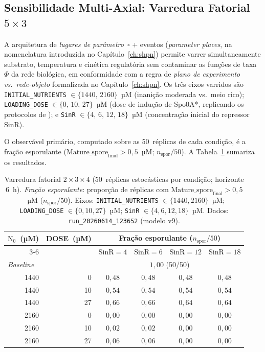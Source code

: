 \subsection{Sensibilidade Multi-Axial: Varredura Fatorial $5 \times 3$}
\label{sec:v6-factorial}

A arquitetura de \emph{lugares de parâmetro}~$\square$ + eventos
(\textit{parameter places}, na nomenclatura introduzida no
Capítulo~\ref{ch:shpn}) permite varrer simultaneamente substrato,
temperatura e cinética regulatória sem contaminar as funções de
taxa~$\Phi$ da rede biológica, em conformidade com a regra de
\emph{plano de experimento vs.\ rede-objeto} formalizada no
Capítulo~\ref{ch:shpn}.  Os três eixos varridos são
\texttt{INITIAL\_NUTRIENTS} $\in \{1440,\,2160\}$~µM (inanição moderada
vs.\ meio rico); \texttt{LOADING\_DOSE} $\in \{0,\,10,\,27\}$~µM (dose
de indução de Spo0A*, replicando os protocolos de \textcite{Fujita2005}); e
\texttt{SinR} $\in \{4,\,6,\,12,\,18\}$~µM (concentração inicial do
repressor SinR).

O observável primário, computado sobre as 50~réplicas de cada condição,
é a fração esporulante
($\text{Mature\_spore}_{\text{final}} > 0{,}5$~µM; $n_{\text{spor}}/50$).
A Tabela~\ref{tab:v6-factorial} sumariza os resultados.

\begin{table}[htbp]
\centering
\caption{Varredura fatorial $2 \times 3 \times 4$
(50~réplicas estocásticas por condição; horizonte 6~h).
\emph{Fração esporulante}: proporção de réplicas com
$\text{Mature\_spore}_{\text{final}} > 0{,}5$~µM ($n_{\text{spor}}/50$).
Eixos: \texttt{INITIAL\_NUTRIENTS} $\in \{1440, 2160\}$~µM;
\texttt{LOADING\_DOSE} $\in \{0, 10, 27\}$~µM;
\texttt{SinR} $\in \{4, 6, 12, 18\}$~µM.
Dados: \texttt{run\_20260614\_123652} (modelo v9).}
\label{tab:v6-factorial}
\small
\begin{tabular}{@{}rrcccc@{}}
\toprule
$\text{N}_0$~(µM) & DOSE~(µM) &
  \multicolumn{4}{c}{\textbf{Fração esporulante ($n_{\text{spor}}/50$)}} \\
\cmidrule(l){3-6}
 &  & SinR$=4$ & SinR$=6$ & SinR$=12$ & SinR$=18$ \\
\midrule
\multicolumn{2}{l}{\textit{Baseline}}
  & \multicolumn{4}{c}{$1{,}00$ (50/50)} \\
\midrule
1440 &  0 & $0{,}48$ & $0{,}48$ & $0{,}48$ & $0{,}48$ \\
1440 & 10 & $0{,}54$ & $0{,}54$ & $0{,}54$ & $0{,}54$ \\
1440 & 27 & $0{,}66$ & $0{,}66$ & $0{,}64$ & $0{,}64$ \\
\midrule
2160 &  0 & $0{,}00$ & $0{,}00$ & $0{,}00$ & $0{,}00$ \\
2160 & 10 & $0{,}02$ & $0{,}02$ & $0{,}00$ & $0{,}00$ \\
2160 & 27 & $0{,}06$ & $0{,}06$ & $0{,}00$ & $0{,}00$ \\
\bottomrule
\end{tabular}
\end{table}

